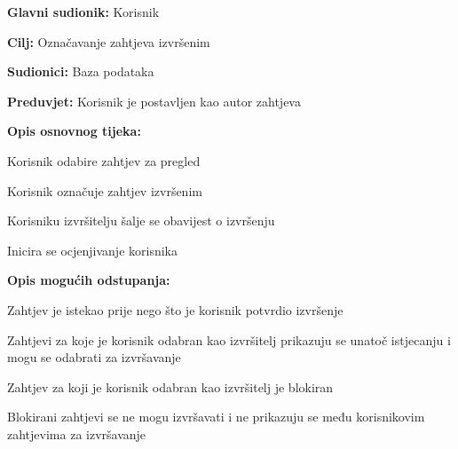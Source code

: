					\noindent {}
					\begin{packed_item}
						
						\item \textbf{Glavni sudionik: }Korisnik
						\item  \textbf{Cilj:} Označavanje zahtjeva izvršenim 
						\item  \textbf{Sudionici:} Baza podataka
						\item  \textbf{Preduvjet:} Korisnik je postavljen kao autor zahtjeva
						\item  \textbf{Opis osnovnog tijeka:}
						
						\item[] \begin{packed_enum}
							
							\item Korisnik odabire zahtjev za pregled
							\item Korisnik označuje zahtjev izvršenim
							\item Korisniku izvršitelju šalje se obavijest o izvršenju
							\item Inicira se ocjenjivanje korisnika
							
						\end{packed_enum}
					
			
						\item  \textbf{Opis mogućih odstupanja:}
							
							\item[] \begin{packed_item}
															
							\item[1.a] Zahtjev je istekao prije nego što je korisnik potvrdio izvršenje
							\item[] \begin{packed_enum}
								
								\item Zahtjevi za koje je korisnik odabran kao izvršitelj prikazuju se unatoč istjecanju i mogu se odabrati za izvršavanje
								
							\end{packed_enum}
							\item[1.b] Zahtjev za koji je korisnik odabran kao izvršitelj je blokiran
							\item[] \begin{packed_enum}
								
								\item Blokirani zahtjevi se ne mogu izvršavati i ne prikazuju se među korisnikovim zahtjevima za izvršavanje
								
									\end{packed_enum}
							

						\end{packed_item}
				\end{packed_item}
				

